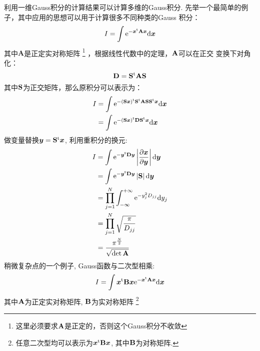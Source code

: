         利用一维Gauss积分的计算结果可以计算多维的Gauss积分. 
        先举一个最简单的例子，其中应用的思想可以用于计算很多不同种类的Gauss
        积分：
        \begin{equation}
            I = \int \mathrm{e}^{-\bm{x}^\mathrm{t}\mathbf{A}\bm{x}}\mathrm{d} \bm{x}
        \end{equation}
        其中$\bm{A}$是正定实对称矩阵
        \footnote{
            这里必须要求$\mathbf{A}$是正定的，否则这个Gauss积分不收敛
        }
        ，根据线性代数中的定理，$\mathbf{A}$可以在正交
        变换下对角化：
        \begin{equation}
            \mathbf{D} = \mathbf{S}^{\mathrm{t}}\mathbf{AS}
        \end{equation}
        其中$\mathbf{S}$为正交矩阵，那么原积分可以表示为：
        \begin{equation}
            \begin{split}
                I &= \int\mathrm{e}^{-(\mathbf{S}\bm{x})^{\mathrm{t}}\mathbf{S}^{\mathrm{t}}\mathbf{AS}\mathbf{S}^{\mathrm{t}}\bm{x}}\mathrm{d} \bm{x}\\
                &= \int\mathrm{e}^{-(\mathbf{S}\bm{x})^{\mathrm{t}}\mathbf{D}\mathbf{S}^{\mathrm{t}}\bm{x}} \mathrm{d} \bm{x}
            \end{split}
        \end{equation}
        做变量替换$\bm{y} = \mathbf{S}^{\mathrm{t}}\bm{x}$, 利用重积分的换元:
        \begin{equation}
            \begin{split}
                I &= \int\mathrm{e}^{-\bm{y}^{\mathrm{t}}\mathbf{D}\bm{y}}\left|\frac{\partial{\bm{x}}}{\partial{\bm{y}}}\right|\mathrm{d} \bm{y}\\
                &= \int\mathrm{e}^{-\bm{y}^{\mathrm{t}}\mathbf{D}\bm{y}}\left|\mathbf{S}\right|\mathrm{d} \bm{y}\\
                &= \prod_{j=1}^{N}\int_{-\infty}^{+\infty}\mathrm{e}^{-y_j^2D_{jj}}\mathrm{d} y_j\\
                &= \prod_{j=1}^{N}\sqrt{\frac{\pi}{D_{jj}}}\\
                &= \frac{\pi^{\frac{N}{2}}}{\sqrt{\det{\mathbf{A}}}}
            \end{split}
        \end{equation}
        稍微复杂点的一个例子, Gauss函数与二次型相乘: 
        \begin{equation}
            I = \int \bm{x}^\mathrm{t}\mathbf{B}\bm{x} \mathrm{e}^{-\bm{x}^\mathrm{t}\mathbf{A}\bm{x}}\mathrm{d}\bm{x}
        \end{equation}
        其中$\mathbf{A}$为正定实对称矩阵, $\mathbf{B}$为实对称矩阵
        \footnote{
            任意二次型均可以表示为$\bm{x}^{\mathrm{t}}\mathbf{B}\bm{x}$, 其中$\mathbf{B}$为对称矩阵.
        }
